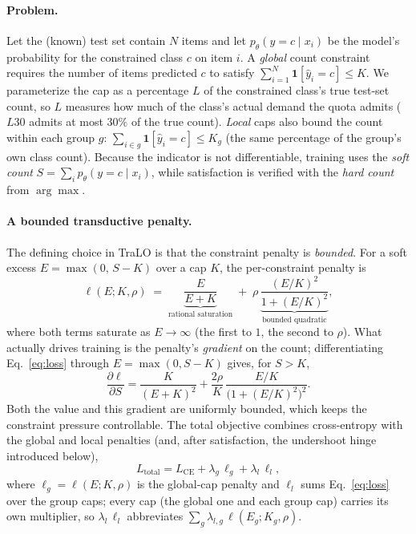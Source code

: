 \documentclass[letterpaper]{article} %
\begin{document}
\paragraph{Problem.}
Let the (known) test set contain $N$ items and let $p_\theta(y=c\mid x_i)$ be the
model's probability for the constrained class $c$ on item $i$. A \emph{global} count
constraint requires the number of items predicted $c$ to satisfy
$\sum_{i=1}^{N}\mathbf{1}[\hat y_i = c] \le K$. We parameterize the cap as a percentage
$L$ of the constrained class's true test-set count, so $L$ measures how much of the
class's actual demand the quota admits ($L30$ admits at most $30\%$ of the true count).
\emph{Local} caps also bound the
count within each group $g$: $\sum_{i\in g}\mathbf{1}[\hat y_i=c]\le K_g$ (the same
percentage of the group's own class count). Because the indicator is not
differentiable, training uses the \emph{soft count} $S=\sum_i p_\theta(y=c\mid x_i)$,
while satisfaction is verified with the \emph{hard count} from $\arg\max$.

\paragraph{A bounded transductive penalty.}
The defining choice in TraLO is that the constraint penalty is \emph{bounded}. For a
soft excess $E = \max(0,\, S - K)$ over a cap $K$, the per-constraint penalty is
\begin{equation}
\label{eq:loss}
\ell(E;K,\rho)\;=\;\underbrace{\frac{E}{E+K}}_{\text{rational saturation}}
\;+\;\rho\,\underbrace{\frac{(E/K)^2}{1+(E/K)^2}}_{\text{bounded quadratic}} ,
\end{equation}
where both terms saturate as $E\!\to\!\infty$ (the first to $1$, the second to $\rho$).
What actually drives training is the penalty's \emph{gradient} on the count; differentiating
Eq.~\eqref{eq:loss} through $E=\max(0,S-K)$ gives, for $S>K$,
\begin{equation}
\label{eq:grad}
\frac{\partial \ell}{\partial S}
= \frac{K}{(E+K)^2} + \frac{2\rho}{K}\,\frac{E/K}{\bigl(1+(E/K)^2\bigr)^2}.
\end{equation}
Both the value and this gradient are uniformly bounded, which keeps the
constraint pressure controllable. The total objective combines cross-entropy with the
global and local penalties (and, after satisfaction, the undershoot hinge introduced below),
\begin{equation}
\label{eq:total}
L_{\text{total}} = L_{\text{CE}} + \lambda_g\,\ell_g + \lambda_l\,\ell_l ,
\end{equation}
where $\ell_g=\ell(E;K,\rho)$ is the global-cap penalty and $\ell_l$ sums
Eq.~\eqref{eq:loss} over the group caps; every cap (the global one and each group
cap) carries its own multiplier, so $\lambda_l\,\ell_l$ abbreviates
$\sum_g \lambda_{l,g}\,\ell(E_g;K_g,\rho)$.
\end{document}
